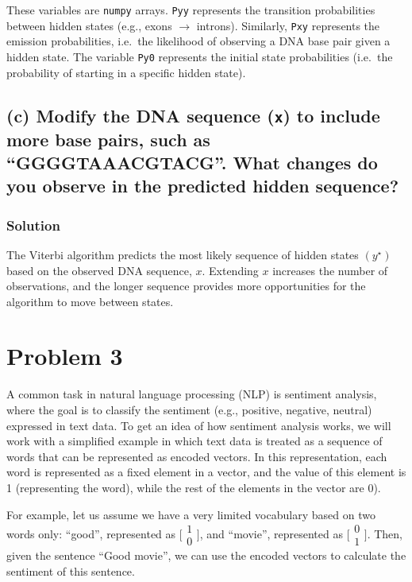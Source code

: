 These variables are \texttt{numpy} arrays.  \texttt{Pyy} represents the transition probabilities
between hidden states (e.g., exons $\rightarrow$ introns).  Similarly, \texttt{Pxy} represents the
emission probabilities, i.e.\ the likelihood of observing a DNA base pair given a hidden state.
The variable \texttt{Py0} represents the initial state probabilities (i.e.\ the probability of starting
in a specific hidden state).

\subsection*{(c) Modify the DNA sequence (\texttt{x}) to include more base pairs, such as “GGGGTAAACGTACG”. What changes do you observe in the predicted hidden sequence?}

\subsubsection*{Solution}

The Viterbi algorithm predicts the most likely sequence of hidden states $(y^\star)$ based on the
observed DNA sequence, $x$.  Extending $x$ increases the number of observations, and the longer
sequence provides more opportunities for the algorithm to move between states.

\section*{Problem 3}

A common task in natural language processing (NLP) is sentiment analysis, where the goal is to classify the
sentiment (e.g., positive, negative, neutral) expressed in text data.  To get an idea of how sentiment analysis
works, we will work with a simplified example in which text data is treated as a sequence of words that can
be represented as encoded vectors.  In this representation, each word is represented as a fixed element in a
vector, and the value of this element is 1 (representing the word), while the rest of the elements in the vector
are 0).

For example, let us assume we have a very limited vocabulary based on two words only: “good”, represented as
\(\bigl[\begin{smallmatrix}1\\0\end{smallmatrix}\bigr]\), and “movie”, represented as
\(\bigl[\begin{smallmatrix}0\\1\end{smallmatrix}\bigr]\).  Then, given the sentence “Good movie”, we can
use the encoded vectors to calculate the sentiment of this sentence.


